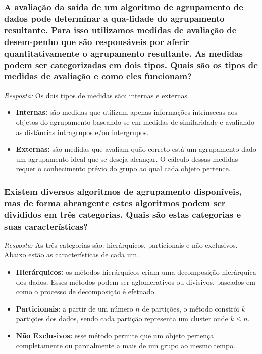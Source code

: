 \documentclass{article}
\begin{document}
  \subsubsection{A avaliação da saída de um algoritmo de agrupamento de dados pode determinar a qua-lidade do agrupamento resultante. Para isso utilizamos medidas de avaliação de desem-penho que são responsáveis por aferir quantitativamente o agrupamento resultante. As medidas podem ser categorizadas em dois tipos. Quais são os tipos de medidas de avaliação e como eles funcionam?}
  \textit{Resposta:} Os dois tipos de medidas são: internas e externas.
  \begin{itemize}
    \item \textbf{Internas:} são medidas que utilizam apenas informações intrínsecas aos objetos do agrupamento baseando-se em medidas de similaridade e avaliando as distâncias intragrupos e/ou intergrupos.
    
    \item  \textbf{Externas:} são medidas que avaliam quão correto está um agrupamento dado um agrupamento ideal que se deseja alcançar. O cálculo dessas medidas requer o conhecimento prévio do grupo ao qual cada objeto pertence. 

  \end{itemize}


  \subsubsection{Existem diversos algoritmos de agrupamento disponíveis, mas de forma abrangente estes algoritmos podem ser divididos em três categorias. Quais são estas categorias e suas características?}
  \textit{Resposta:} As três categorias são: hierárquicos, particionais e não exclusivos.
  Abaixo estão as características de cada um.
  \begin{itemize}
    \item \textbf{Hierárquicos:} os métodos hierárquicos criam uma decomposição hierárquica dos dados. Esses métodos podem ser aglomerativos ou divisivos, baseados em como o processo de decomposição é efetuado. 

    \item \textbf{Particionais:} a partir de um número $n$ de partições, o método constrói $k$ partições dos dados, sendo cada partição representa um cluster onde $k \leq n$.  

    \item \textbf{Não Exclusivos:} esse método permite que um objeto pertença completamente ou parcialmente a mais de um grupo ao mesmo tempo.
  \end{itemize}
  \newpage
\end{document}
